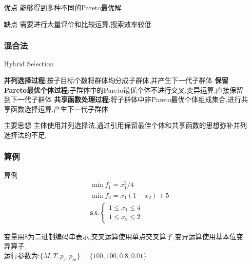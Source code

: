 \documentclass{beamer}
\begin{document}
\begin{frame}
\begin{block}{优点}
	能够得到多种不同的Pareto最优解
\end{block}
\begin{block}{缺点}
	需要进行大量评价和比较运算,搜索效率较低
\end{block}
\end{frame}
\begin{frame}
	\frametitle{混合法}
	\begin{algorithm}[H]                           %
		\caption{Hybrid Selection}          %
		\label{alg2}      %
		\begin{algorithmic}[1]  %
			\STATE \textbf{并列选择过程}:按子目标个数将群体均分成子群体,并产生下一代子群体
			\STATE \textbf{保留Pareto最优个体过程}:子群体中的Pareto最优个体不进行交叉,变异运算,直接保留到下一代子群体
			\STATE \textbf{共享函数处理过程}:将子群体中非Pareto最优个体组成集合,进行共享函数选择运算,产生下一代子群体
		\end{algorithmic}
	\end{algorithm}
		\begin{block}{主要思想}
			主体使用并列选择法,通过引用保留最佳个体和共享函数的思想弥补并列选择法的不足.
		\end{block}
	

\end{frame}
\begin{frame}
	\frametitle{算例}
	\begin{block}{算例}
		\begin{eqnarray*}
			&\min f_1=x_1^2/4\\
			&\min f_2=x_1(1-x_2)+5\\
			&\textbf{s.t.} \left\{ \begin{array}{c}
				1\le x_1 \le 4\\
				1\le x_2 \le 2	
			\end{array} \right.
		\end{eqnarray*}
	\end{block}
	\begin{block}{}
		变量用8为二进制编码串表示,交叉运算使用单点交叉算子,变异运算使用基本位变异算子.\\
		运行参数为:$ \{ M,T,p_c,p_m \} = \{ 100,100,0.8,0.01 \}$
		
	\end{block}

	

\end{frame}
\end{document}
